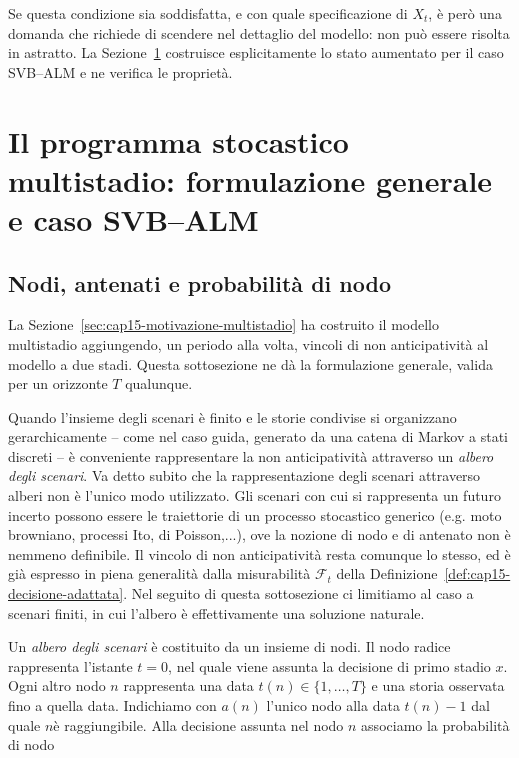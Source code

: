 Se questa condizione sia soddisfatta, e con quale specificazione di $X_t$,
\`e per\`o una domanda che richiede di scendere nel dettaglio del modello:
non pu\`o essere risolta in astratto. La
Sezione~\ref{sec:cap15-programma-multistadio} costruisce esplicitamente lo
stato aumentato per il caso SVB--ALM e ne verifica le propriet\`a.

\section{Il programma stocastico multistadio: formulazione generale e
caso SVB--ALM}

\label{sec:cap15-programma-multistadio}

\subsection{Nodi, antenati e probabilit\`a di nodo}

La Sezione~\ref{sec:cap15-motivazione-multistadio} ha costruito il modello
multistadio aggiungendo, un periodo alla volta, vincoli di non
anticipativit\`a al modello a due stadi. Questa sottosezione ne d\`a la
formulazione generale, valida per un orizzonte $T$ qualunque.

Quando l'insieme degli scenari \`e finito e le storie condivise si
organizzano gerarchicamente -- come nel caso guida, generato da una
catena di Markov a stati discreti -- \`e conveniente rappresentare la
non anticipativit\`a attraverso un \emph{albero degli scenari}. Va
detto subito che la rappresentazione degli scenari attraverso alberi non \`e
l'unico modo utilizzato. Gli scenari con cui si rappresenta un futuro incerto possono essere le
traiettorie di un processo stocastico generico (e.g. moto browniano, processi Ito, di Poisson,...), ove la nozione di nodo e di antenato non \`e nemmeno definibile. Il vincolo di non anticipativit\`a resta
comunque lo stesso, ed \`e gi\`a espresso in piena generalit\`a dalla
misurabilit\`a $\mathcal F_t$ della Definizione~\ref{def:cap15-decisione-adattata}.
Nel seguito di questa sottosezione ci limitiamo al caso a scenari
finiti, in cui l'albero \`e effettivamente una soluzione naturale.

Un \emph{albero degli scenari} \`e costituito da un insieme di nodi. Il nodo
radice rappresenta l'istante $t=0$, nel quale viene assunta la decisione di
primo stadio $x$. Ogni altro nodo $n$ rappresenta una data $t(n)\in\{1,\ldots,T\}$
e una storia osservata fino a quella data. Indichiamo con $a(n)$
l'unico nodo alla data $t(n)-1$ dal quale $n$\`e
raggiungibile.
Alla decisione assunta nel nodo $n$ associamo la probabilit\`a
di nodo

